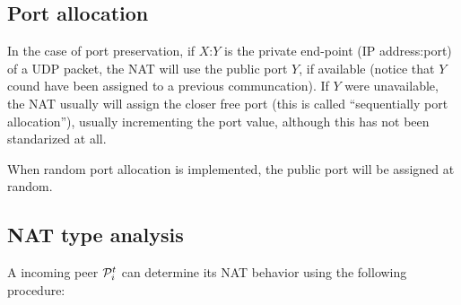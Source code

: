 \subsection{Port allocation}
In the case of port preservation, if $X$:$Y$ is the private end-point
(IP address:port) of a UDP packet, the NAT will use the public port
$Y$, if available (notice that $Y$ cound have been assigned to a
previous communcation). If $Y$ were unavailable, the NAT usually will
assign the closer free port (this is called ``sequentially port
allocation''), usually incrementing the port value, although this has
not been standarized at all.

When random port allocation is implemented, the public port will be
assigned at random.

\subsection{NAT type analysis}
A incoming peer ${\cal P}^t_i$ can determine its NAT behavior using
the following procedure:
